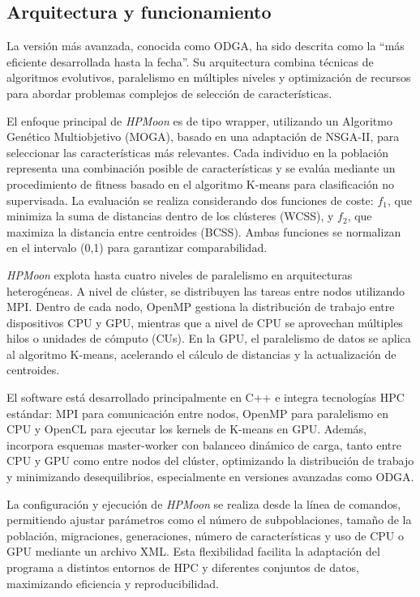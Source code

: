 \subsection{Arquitectura y funcionamiento}\label{subsec:hpm_funcionamiento}

La versión más avanzada, conocida como ODGA, ha sido descrita como la ``más eficiente desarrollada hasta la fecha''. Su arquitectura combina técnicas de algoritmos evolutivos, paralelismo en múltiples niveles y optimización de recursos para abordar problemas complejos de selección de características.

El enfoque principal de \textit{HPMoon} es de tipo wrapper, utilizando un Algoritmo Genético Multiobjetivo (MOGA), basado en una adaptación de NSGA-II, para seleccionar las características más relevantes. Cada individuo en la población representa una combinación posible de características y se evalúa mediante un procedimiento de fitness basado en el algoritmo K-means para clasificación no supervisada. La evaluación se realiza considerando dos funciones de coste: $f_1$, que minimiza la suma de distancias dentro de los clústeres (WCSS), y $f_2$, que maximiza la distancia entre centroides (BCSS). Ambas funciones se normalizan en el intervalo (0,1) para garantizar comparabilidad.

\textit{HPMoon} explota hasta cuatro niveles de paralelismo en arquitecturas heterogéneas. A nivel de clúster, se distribuyen las tareas entre nodos utilizando MPI. Dentro de cada nodo, OpenMP gestiona la distribución de trabajo entre dispositivos CPU y GPU, mientras que a nivel de CPU se aprovechan múltiples hilos o unidades de cómputo (CUs). En la GPU, el paralelismo de datos se aplica al algoritmo K-means, acelerando el cálculo de distancias y la actualización de centroides.

El software está desarrollado principalmente en C++ e integra tecnologías HPC estándar: MPI para comunicación entre nodos, OpenMP para paralelismo en CPU y OpenCL para ejecutar los kernels de K-means en GPU. Además, incorpora esquemas master-worker con balanceo dinámico de carga, tanto entre CPU y GPU como entre nodos del clúster, optimizando la distribución de trabajo y minimizando desequilibrios, especialmente en versiones avanzadas como ODGA.

La configuración y ejecución de \textit{HPMoon} se realiza desde la línea de comandos, permitiendo ajustar parámetros como el número de subpoblaciones, tamaño de la población, migraciones, generaciones, número de características y uso de CPU o GPU mediante un archivo XML. Esta flexibilidad facilita la adaptación del programa a distintos entornos de HPC y diferentes conjuntos de datos, maximizando eficiencia y reproducibilidad.

